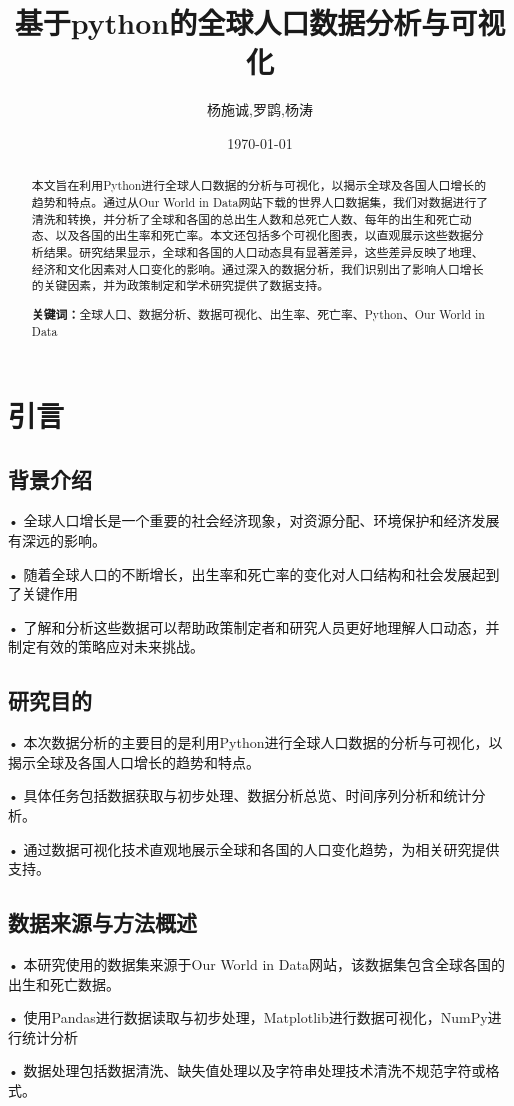 \documentclass{ctexart}
\title{基于python的全球人口数据分析与可视化}
\author{\fontsize{14pt}{14pt}
\selectfont 杨施诚,罗鹍,杨涛}
\date{\today}
\begin{document}
    \maketitle
    \begin{abstract}
        {\noindent 本文旨在利用Python进行全球人口数据的分析与可视化，以揭示全球及各国人口增长的趋势和特点。通过从Our World in Data网站下载的世界人口数据集，我们对数据进行了清洗和转换，并分析了全球和各国的总出生人数和总死亡人数、每年的出生和死亡动态、以及各国的出生率和死亡率。本文还包括多个可视化图表，以直观展示这些数据分析结果。研究结果显示，全球和各国的人口动态具有显著差异，这些差异反映了地理、经济和文化因素对人口变化的影响。通过深入的数据分析，我们识别出了影响人口增长的关键因素，并为政策制定和学术研究提供了数据支持。}
        \par\noindent \textbf{关键词：}全球人口、数据分析、数据可视化、出生率、死亡率、Python、Our World in Data
    \end{abstract}

    \newpage
    \tableofcontents

    \newpage
    \section{\textbf{引言}}
    	\subsection{\textbf{背景介绍}}
    •	全球人口增长是一个重要的社会经济现象，对资源分配、环境保护和经济发展有深远的影响。\par 
    •	随着全球人口的不断增长，出生率和死亡率的变化对人口结构和社会发展起到了关键作用\par 
    •	了解和分析这些数据可以帮助政策制定者和研究人员更好地理解人口动态，并制定有效的策略应对未来挑战。
    	\subsection{\textbf{研究目的}}
    •	本次数据分析的主要目的是利用Python进行全球人口数据的分析与可视化，以揭示全球及各国人口增长的趋势和特点。\par 
    •	具体任务包括数据获取与初步处理、数据分析总览、时间序列分析和统计分析。\par 
    •	通过数据可视化技术直观地展示全球和各国的人口变化趋势，为相关研究提供支持。
    	\subsection{\textbf{数据来源与方法概述}}
    •	本研究使用的数据集来源于Our World in Data网站，该数据集包含全球各国的出生和死亡数据。\par 
    •	使用Pandas进行数据读取与初步处理，Matplotlib进行数据可视化，NumPy进行统计分析\par 
    •	数据处理包括数据清洗、缺失值处理以及字符串处理技术清洗不规范字符或格式。
\end{document}
